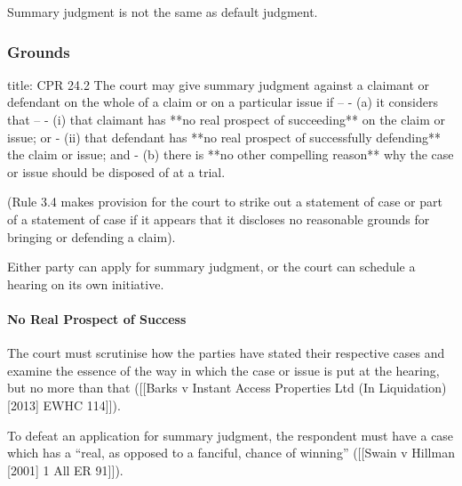 \documentclass[
]{article}
\newenvironment{Shaded}{}{}
\newcommand{\NormalTok}[1]{#1}
\begin{document}
\begin{Shaded}
\begin{Highlighting}[]
\NormalTok{Summary judgment is not the same as default judgment.}
\end{Highlighting}
\end{Shaded}

\hypertarget{grounds}{%
\subsubsection{Grounds}\label{grounds}}

\begin{Shaded}
\begin{Highlighting}[]
\NormalTok{title: CPR 24.2}
\NormalTok{The court may give summary judgment against a claimant or defendant on the whole of a claim or on a particular issue if –}
\NormalTok{{-} (a) it considers that –}
\NormalTok{    {-} (i) that claimant has **no real prospect of succeeding** on the claim or issue; or}
\NormalTok{    {-} (ii) that defendant has **no real prospect of successfully defending** the claim or issue; and}
\NormalTok{{-} (b) there is **no other compelling reason** why the case or issue should be disposed of at a trial.}
\end{Highlighting}
\end{Shaded}

(Rule 3.4 makes provision for the court to strike out a statement of
case or part of a statement of case if it appears that it discloses no
reasonable grounds for bringing or defending a claim).

Either party can apply for summary judgment, or the court can schedule a
hearing on its own initiative.

\hypertarget{no-real-prospect-of-success}{%
\paragraph{No Real Prospect of
Success}\label{no-real-prospect-of-success}}

The court must scrutinise how the parties have stated their respective
cases and examine the essence of the way in which the case or issue is
put at the hearing, but no more than that ({[}{[}Barks v Instant Access
Properties Ltd (In Liquidation) {[}2013{]} EWHC 114{]}{]}).

To defeat an application for summary judgment, the respondent must have
a case which has a ``real, as opposed to a fanciful, chance of winning''
({[}{[}Swain v Hillman {[}2001{]} 1 All ER 91{]}{]}).
\end{document}
